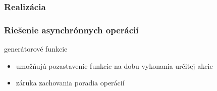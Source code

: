 \documentclass[pdf]{beamer}
\begin{document}
\begin{frame}
\frametitle{Realizácia}

\begin{figure}[h]
\label{labelledSelect}
\end{figure}

\begin{figure}[h]
\label{labelledSelect}
\end{figure} 

\begin{figure}[h]
\label{labelledSelect}
\end{figure} 


\begin{figure}[h]
\label{labelledSelect}
\end{figure}

\end{frame}

\begin{frame}
\frametitle{Riešenie asynchrónnych operácií}

\begin{block}{generátorové funkcie}

\begin{itemize}
\item umožňujú pozastavenie funkcie na dobu vykonania určitej akcie
\item záruka zachovania poradia operácií
\end{itemize}

\end{block}
\end{frame}
\end{document}
